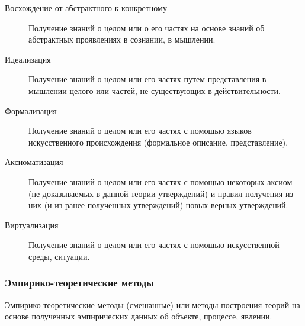 \begin{description}
    \item [Восхождение от абстрактного к конкретному]
          Получение знаний о целом или о его частях на основе знаний об абстрактных проявлениях в сознании, в мышлении.
    \item [Идеализация]
          Получение знаний о целом или его частях путем представления в мышлении целого или частей, не существующих в действительности.
    \item [Формализация]
          Получение знаний о целом или его частях с помощью языков искусственного происхождения (формальное описание, представление).
    \item [Аксиоматизация]
          Получение знаний о целом или его частях с помощью некоторых аксиом (не доказываемых в данной теории утверждений) и правил получения из них (и из ранее полученных утверждений) новых верных утверждений.
    \item [Виртуализация]
          Получение знаний о целом или его частях с помощью искусственной среды, ситуации.
\end{description}

\subsubsection*{Эмпирико-теоретические методы}\label{subsubsec:empirical-theoretical-methods}

Эмпирико-теоретические методы (смешанные) или методы построения теорий на основе полученных эмпирических данных об объекте, процессе, явлении.

